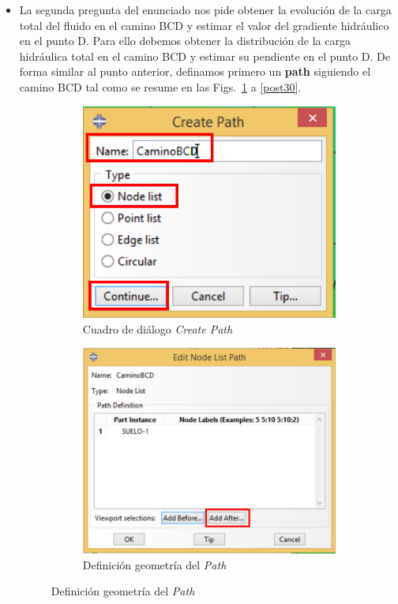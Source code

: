 \begin{itemize}
\item La segunda pregunta del enunciado nos pide obtener la evolución
  de la carga total del fluido en el camino BCD y estimar el valor del
  gradiente hidráulico en el punto D. Para ello debemos obtener la
  distribución de la carga hidráulica total en el camino BCD y estimar
  su pendiente en el punto D. De forma similar al punto anterior,
  definamos primero un \textbf{path} siguiendo el camino BCD tal como
  se resume en las Figs.~\ref{post27} a \ref{post30}.
  \begin{figure}[!h]
    \centering
    \begin{subfigure}[!h]{0.50\textwidth}
      \includegraphics[width=\textwidth]{./body/images/post27.pdf}
      \caption{Cuadro de diálogo \textit{Create Path}}
      \label{post27}
    \end{subfigure}%
    \begin{subfigure}[!h]{0.50\textwidth}
      \includegraphics[width=\textwidth]{./body/images/post28.pdf}
      \caption{Definición geometría del \textit{Path}}
      \label{post28}
    \end{subfigure}%


\end{figure}
\end{itemize}
